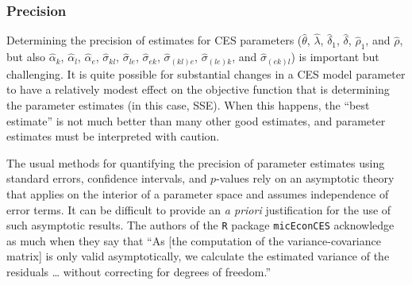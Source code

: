 \documentclass[preprint,10pt,3p]{elsarticle}\usepackage[]{graphicx}\usepackage[]{color}
\newcommand{\sse}{\mbox{SSE}}
\begin{document}
\subsubsection{Precision} 
\label{sec:parameter_precision}

Determining the precision of estimates for CES parameters
($\hat\theta$, $\hat\lambda$, $\hat\delta_1$, $\hat\delta$, $\hat\rho_1$, 
and $\hat\rho$, but also
$\hat\alpha_k$, $\hat\alpha_l$, $\hat\alpha_e$, 
$\hat\sigma_{kl}$, $\hat\sigma_{le}$, $\hat\sigma_{ek}$, 
$\hat\sigma_{(kl)e}$, $\hat\sigma_{(le)k}$, and $\hat\sigma_{(ek)l}$)
is important but challenging.
It is quite possible for substantial changes in a CES model parameter
to have a relatively modest effect on the objective function
that is determining the parameter estimates (in this case, \sse).
When this happens, the ``best estimate''
is not much better than many other good estimates, and parameter
estimates must be interpreted with caution.

The usual methods for quantifying the precision of parameter estimates
using standard errors, confidence intervals,
and $p$-values rely on an asymptotic theory that applies
on the interior of a parameter space and assumes independence of error terms.
It can be difficult to provide an \emph{a priori} justification
for the use of such asymptotic results.
The authors of the \texttt{R} package \texttt{micEconCES}
acknowledge as much when they say that
``As [the computation of the variance-covariance
matrix] is only valid asymptotically,
we calculate the estimated variance of the residuals \dots
without correcting for degrees of freedom.'' \citep{Henningsen:2011td}
\end{document}
